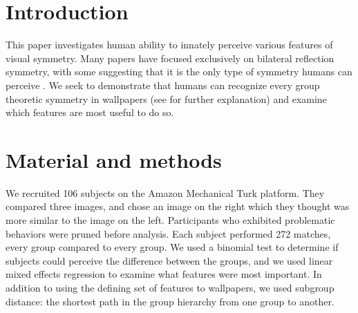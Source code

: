 \section{Introduction}
This paper investigates human ability to innately perceive various features of visual symmetry. Many papers have focused exclusively on bilateral reflection symmetry, with some suggesting that it is the only type of symmetry humans can perceive \citep{bio}. We seek to demonstrate that humans can recognize every group theoretic symmetry in wallpapers (see \citet{yanxibook} for further explanation) and examine which features are most useful to do so.

\section{Material and methods}
We recruited 106 subjects on the Amazon Mechanical Turk platform. They compared three images, and chose an image on the right which they thought was more similar to the image on the left. Participants who exhibited problematic behaviors were pruned before analysis. Each subject performed 272 matches, every group compared to every group. We used a binomial test to determine if subjects could perceive the difference between the groups, and we used linear mixed effects regression to examine what features were most important. In addition to using the defining set of features to wallpapers, we used subgroup distance: the shortest path in the group hierarchy from one group to another.

